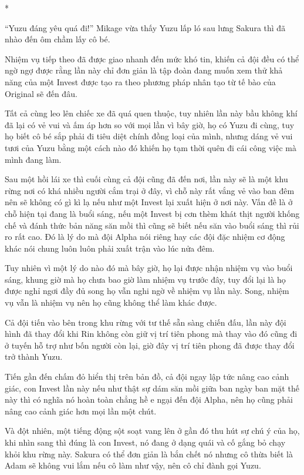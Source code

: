 {*

``Yuzu đáng yêu quá đi!'' Mikage vừa thấy Yuzu lấp ló sau lưng Sakura
thì đã nhào đến ôm chầm lấy cô bé.

Nhiệm vụ tiếp theo đã được giao nhanh đến mức khó tin, khiến cả đội đều
có thể ngờ ngợ được rằng lần này chỉ đơn giản là tập đoàn đang muốn xem
thử khả năng của một Invest được tạo ra theo phương pháp nhân tạo từ tế
bào của Original sẽ đến đâu.

Tất cả cùng leo lên chiếc xe đã quá quen thuộc, tuy nhiên lần này bầu
không khí đã lại có vẻ vui và ấm áp hơn so với mọi lần vì bây giờ, họ có
Yuzu đi cùng, tuy họ biết cô bé sắp phải đi tiêu diệt chính đồng loại
của mình, nhưng dáng vẻ vui tươi của Yuzu bằng một cách nào đó khiến họ
tạm thời quên đi cái công việc mà mình đang làm.

Sau một hồi lái xe thì cuối cùng cả đội cũng đã đến nơi, lần này sẽ là
một khu rừng nơi có khá nhiều người cắm trại ở đây, vì chỗ này rất vắng
vẻ vào ban đêm nên sẽ không có gì kì lạ nếu như một Invest lại xuất hiện
ở nơi này. Vấn đề là ở chỗ hiện tại đang là buổi sáng, nếu một Invest bị
cơn thèm khát thịt người khống chế và đánh thức bản năng săn mồi thì
cũng sẽ biết nếu săn vào buổi sáng thì rủi ro rất cao. Đó là lý do mà
đội Alpha nói riêng hay các đội đặc nhiệm cơ động khác nói chung luôn
luôn phải xuất trận vào lúc nửa đêm.

Tuy nhiên vì một lý do nào đó mà bây giờ, họ lại được nhận nhiệm vụ vào
buổi sáng, khung giờ mà họ chưa bao giờ làm nhiệm vụ trước đây, tuy đổi
lại là họ được nghỉ ngơi đầy đủ song họ vẫn nghi ngờ về nhiệm vụ lần
này. Song, nhiệm vụ vẫn là nhiệm vụ nên họ cũng không thể làm khác được.

Cả đội tiến vào bên trong khu rừng với tư thế sẵn sàng chiến đấu, lần
này đội hình đã thay đổi khi Rin không còn giữ vị trí tiên phong mà thay
vào đó cũng đi ở tuyến hỗ trợ như bốn người còn lại, giờ đây vị trí tiên
phong đã được thay đổi trở thành Yuzu.

Tiến gần đến chấm đỏ hiển thị trên bản đồ, cả đội ngay lập tức nâng cao
cảnh giác, con Invest lần này nếu như thật sự dám săn mồi giữa ban ngày
ban mặt thế này thì có nghĩa nó hoàn toàn chẳng hề e ngại đến đội Alpha,
nên họ cũng phải nâng cao cảnh giác hơn mọi lần một chút.

Và đột nhiên, một tiếng động sột soạt vang lên ở gần đó thu hút sự chú ý
của họ, khi nhìn sang thì đúng là con Invest, nó đang ở dạng quái và cố
gắng bỏ chạy khỏi khu rừng này. Sakura có thể đơn giản là bắn chết nó
nhưng cô thừa biết là Adam sẽ không vui lắm nếu cô làm như vậy, nên cô
chỉ đành gọi Yuzu.

}
